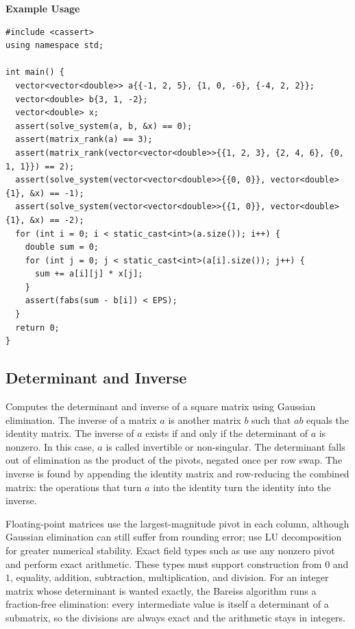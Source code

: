 \textbf{Example Usage}\par
\begin{lstlisting}[style=cpp]
#include <cassert>
using namespace std;

int main() {
  vector<vector<double>> a{{-1, 2, 5}, {1, 0, -6}, {-4, 2, 2}};
  vector<double> b{3, 1, -2};
  vector<double> x;
  assert(solve_system(a, b, &x) == 0);
  assert(matrix_rank(a) == 3);
  assert(matrix_rank(vector<vector<double>>{{1, 2, 3}, {2, 4, 6}, {0, 1, 1}}) == 2);
  assert(solve_system(vector<vector<double>>{{0, 0}}, vector<double>{1}, &x) == -1);
  assert(solve_system(vector<vector<double>>{{1, 0}}, vector<double>{1}, &x) == -2);
  for (int i = 0; i < static_cast<int>(a.size()); i++) {
    double sum = 0;
    for (int j = 0; j < static_cast<int>(a[i].size()); j++) {
      sum += a[i][j] * x[j];
    }
    assert(fabs(sum - b[i]) < EPS);
  }
  return 0;
}
\end{lstlisting}
\subsection{Determinant and Inverse}
\label{sec:6.5.3}
Computes the determinant and inverse of a square matrix using Gaussian elimination. The inverse of a matrix $a$ is another matrix $b$ such that $ab$ equals the identity matrix. The inverse of $a$ exists if and only if the determinant of $a$ is nonzero. In this case, $a$ is called invertible or non-singular. The determinant falls out of elimination as the product of the pivots, negated once per row swap. The inverse is found by appending the identity matrix and row-reducing the combined matrix: the operations that turn $a$ into the identity turn the identity into the inverse.

Floating-point matrices use the largest-magnitude pivot in each column, although Gaussian elimination can still suffer from rounding error; use LU decomposition for greater numerical stability. Exact field types such as  use any nonzero pivot and perform exact arithmetic. These types must support construction from $0$ and $1$, equality, addition, subtraction, multiplication, and division. For an integer matrix whose determinant is wanted exactly, the Bareiss algorithm runs a fraction-free elimination: every intermediate value is itself a determinant of a submatrix, so the divisions are always exact and the arithmetic stays in integers.

